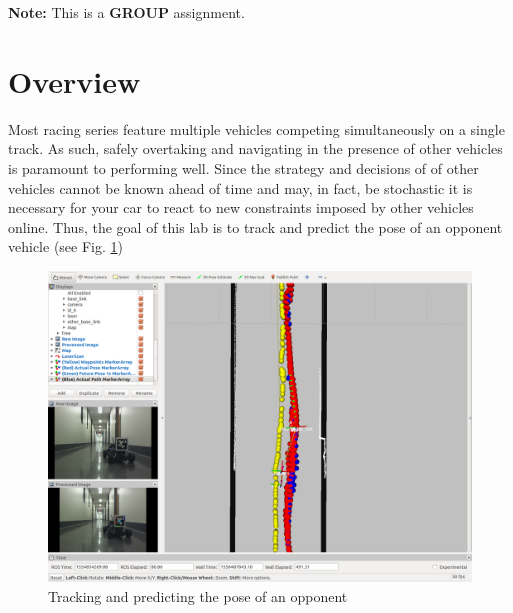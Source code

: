 \documentclass[letta4 paper]{article}
\begin{document}

\noindent\textbf{Note:} This is a \textbf{GROUP} assignment.

\section{Overview}
Most racing series feature multiple vehicles competing simultaneously on a single track. As such, safely overtaking and navigating in the presence of other vehicles is paramount to performing well. Since the strategy and decisions of of other vehicles cannot be known ahead of time and may, in fact, be stochastic it is necessary for your car to react to new constraints imposed by other vehicles online.
Thus, the goal of this lab is to track and predict the pose of an opponent vehicle (see Fig. \ref{fig:overview})
\begin{figure}[h!b]
  \centering
    \includegraphics[width=\textwidth]{actual-versus-predicted-path-13.png}
   \caption{Tracking and predicting the pose of an opponent}
   \label{fig:overview}
\end{figure}
\end{document}
